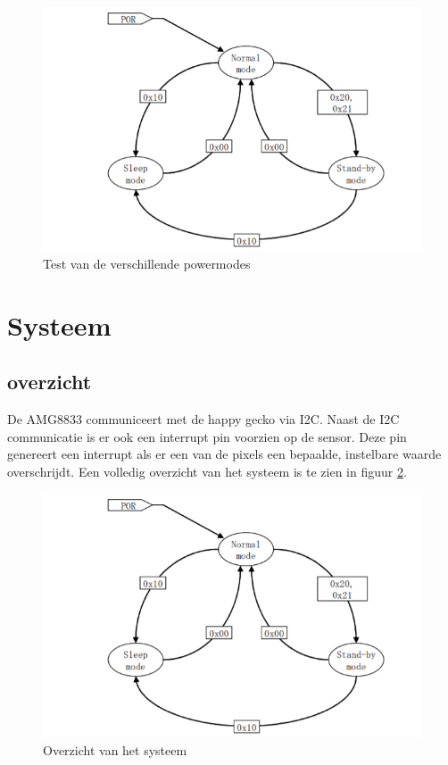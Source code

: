\documentclass[]{article}
\begin{document}
\begin{figure}[!ht]
	\centering
	\includegraphics{operatingmodes.png}
	\caption{Test van de verschillende powermodes}
	\label{fig:powertest}
\end{figure}
\section{Systeem}
\subsection{overzicht}
De AMG8833 communiceert met de happy gecko via I2C. Naast de I2C communicatie is er ook een interrupt pin voorzien op de sensor. Deze pin genereert een interrupt als er een van de pixels een bepaalde, instelbare waarde overschrijdt. Een volledig overzicht van het systeem is te zien in figuur \ref{fig:systeem}.
\begin{figure}[!ht]
	\centering
	\includegraphics{operatingmodes.png}
	\caption{Overzicht van het systeem}
	\label{fig:systeem}
\end{figure}
\end{document}
